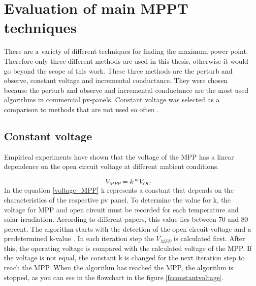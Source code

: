 \section{Evaluation of main MPPT techniques\label{MPPTalgo}}

There are a variety of different techniques for finding the maximum power point. Therefore only three different methods are used in this thesis, otherwise it would go beyond the scope of this work. These three methods are the perturb and observe, constant voltage and incremental conductance. They were chosen because the perturb and observe and incremental conductance are the most used algorithms in commercial pv-panels.  Constant voltage was selected as a comparison to methods that are not used so often . 

\subsection{Constant voltage}
Empirical experiments have shown that the voltage of the MPP has a linear dependence on the open circuit voltage at different ambient conditions.

\begin{equation} \label{voltage_MPP}
V_{MPP} = k * V_{OC}	
\end{equation} 
In the equation \ref{voltage_MPP} k represents a constant that depends on the characteristics of the respective pv panel. To determine the value for k, the voltage for MPP and open circuit must be recorded for each temperature and solar irradiation. According to different papers, this value lies between 70 and 80 percent. The algorithm starts with the detection of the open circuit voltage and a predetermined k-value . In each iteration step the $V_{MPP}$ is calculated first. After this, the operating voltage is compared with the calculated voltage of the MPP. If the voltage is not equal, the constant k is changed for the next iteration step to reach the MPP. When the algorithm has reached the MPP, the algorithm is stopped, as you can see in the flowchart in the figure \ref{fcconstantvoltage}\cite{}. 

